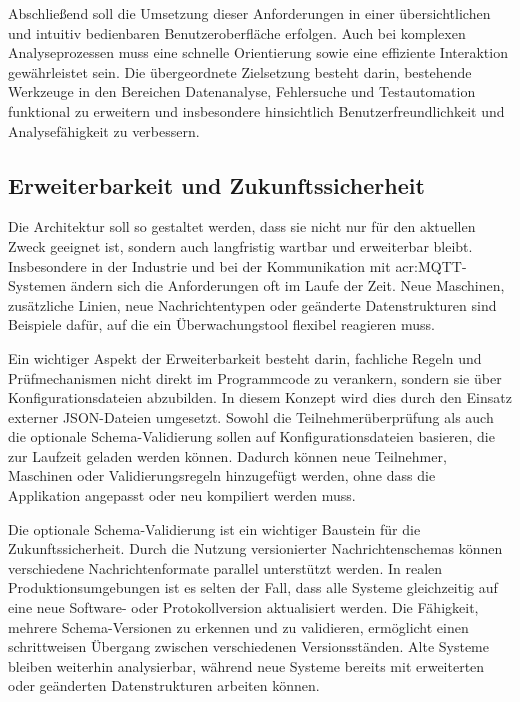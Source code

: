 Abschließend soll die Umsetzung dieser Anforderungen in einer übersichtlichen 
und intuitiv bedienbaren Benutzeroberfläche erfolgen. Auch bei komplexen 
Analyseprozessen muss eine schnelle Orientierung sowie eine effiziente 
Interaktion gewährleistet sein. Die übergeordnete Zielsetzung besteht darin, 
bestehende Werkzeuge in den Bereichen Datenanalyse, Fehlersuche und 
Testautomation funktional zu erweitern und insbesondere hinsichtlich 
Benutzerfreundlichkeit und Analysefähigkeit zu verbessern.

\subsection{Erweiterbarkeit und Zukunftssicherheit}
    Die Architektur soll so gestaltet werden, dass sie nicht nur für den aktuellen Zweck geeignet ist, sondern auch langfristig wartbar und erweiterbar bleibt. 
    Insbesondere in der Industrie und bei der Kommunikation mit \acrshort{acr:MQTT}-Systemen ändern sich die Anforderungen oft im Laufe der Zeit. Neue Maschinen, zusätzliche Linien, 
    neue Nachrichtentypen oder geänderte Datenstrukturen sind Beispiele dafür, auf die ein Überwachungstool flexibel reagieren muss.

    Ein wichtiger Aspekt der Erweiterbarkeit besteht darin, fachliche Regeln und Prüfmechanismen nicht direkt im Programmcode zu verankern, 
    sondern sie über Konfigurationsdateien abzubilden. In diesem Konzept wird dies durch den Einsatz externer JSON-Dateien umgesetzt. Sowohl die Teilnehmerüberprüfung 
    als auch die optionale Schema-Validierung sollen auf Konfigurationsdateien basieren, die zur Laufzeit geladen werden können. Dadurch können neue Teilnehmer, Maschinen oder 
    Validierungsregeln hinzugefügt werden, ohne dass die Applikation angepasst oder neu kompiliert werden muss.

    Die optionale Schema-Validierung ist ein wichtiger Baustein für die Zukunftssicherheit. Durch die Nutzung versionierter Nachrichtenschemas können verschiedene 
    Nachrichtenformate parallel unterstützt werden. In realen Produktionsumgebungen ist es selten der Fall, dass alle Systeme gleichzeitig auf eine neue Software- 
    oder Protokollversion aktualisiert werden. Die Fähigkeit, mehrere Schema-Versionen zu erkennen und zu validieren, ermöglicht einen schrittweisen Übergang zwischen 
    verschiedenen Versionsständen. Alte Systeme bleiben weiterhin analysierbar, während neue Systeme bereits mit erweiterten oder geänderten Datenstrukturen arbeiten können.

